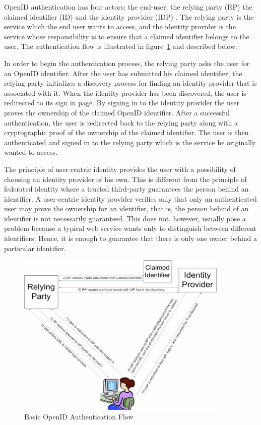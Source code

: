 \documentclass[english,gradu]{tktltiki}
\begin{document}
OpenID authentication has four actors: the end-user, the relying party (RP) the claimed identifier (ID) and the identity provider (IDP) \cite{openid_2.0_platform_2009}. The relying party is the service which the end user wants to access, and the identity provider is the service whose responsibility is to ensure that a claimed identifier belongs to the user. The authentication flow is illustrated in figure~\ref{fig:basic_openid_flow} and described below.

In order to begin the authentication process, the relying party asks the user for an OpenID identifier. After the user has submitted his claimed identifier, the relying party initializes a discovery process for finding an identity provider that is associated with it. When the identity provider has been discovered, the user is redirected to its sign in page. By signing in to the identity provider the user proves the ownership of the claimed OpenID identifier. After a successful authentication, the user is redirected back to the relying party along with a cryptographic proof of the ownership of the claimed identifier. The user is then authenticated and signed in to the relying party which is the service he originally wanted to access.

The principle of user-centric identity provides the user with a possibility of choosing an identity provider of his own. This is different from the principle of federated identity where a trusted third-party guarantees the person behind an identifier. A user-centric identity provider verifies only that only an authenticated user may prove the ownership for an identifier, that is, the person behind of an identifier is not necessarily guaranteed. This does not, however, usually pose a problem because a typical web service wants only to distinguish between different identifiers. Hence, it is enough to guarantee that there is only one owner behind a particular identifier.

     \begin{figure}
       \centering
       \includegraphics[width=0.9\textwidth]{images/openid_flow_recordon06.jpg}
       \caption{Basic OpenID Authentication Flow \cite{openid_2.0_platform_2009}}
       \label{fig:basic_openid_flow}
     \end{figure}
\end{document}
